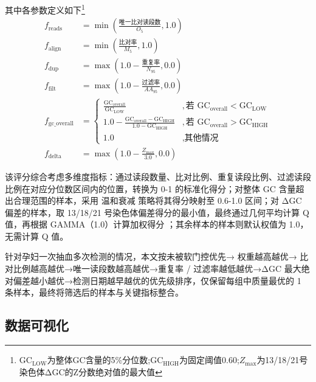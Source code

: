 其中各参数定义如下\footnote{\( \text{GC}_{\text{LOW}} \)为整体GC含量的5\%分位数;\( \text{GC}_{\text{HIGH}} \)为固定阈值0.60;\( Z_{\text{max}} \)为13/18/21号染色体ΔGC的Z分数绝对值的最大值}
\begin{align*}
f_{\text{reads}} &= \min\left( \frac{\text{唯一比对读段数}}{O_5}, 1.0 \right) \\
f_{\text{align}} &= \min\left( \frac{\text{比对率}}{M_5}, 1.0 \right) \\
f_{\text{dup}} &= \max\left( 1.0 - \frac{\text{重复率}}{N_{95}}, 0.0 \right) \\
f_{\text{filt}} &= \max\left( 1.0 - \frac{\text{过滤率}}{AA_{95}}, 0.0 \right) \\
f_{\text{gc\_overall}} &= 
\begin{cases} 
\frac{\text{GC}_{\text{overall}}}{\text{GC}_{\text{LOW}}} & ,\text{若 } \text{GC}_{\text{overall}} < \text{GC}_{\text{LOW}} \\
1.0 - \frac{\text{GC}_{\text{overall}} - \text{GC}_{\text{HIGH}}}{1.0 - \text{GC}_{\text{HIGH}}} & ,\text{若 } \text{GC}_{\text{overall}} > \text{GC}_{\text{HIGH}} \\
1.0 & ,\text{其他情况}
\end{cases} \\
f_{\text{delta}} &= \max\left( 1.0 - \frac{Z_{\text{max}}}{3.0}, 0.0 \right)
\end{align*}


该评分综合考虑多维度指标：通过读段数量、比对比例、重复读段比例、过滤读段比例在对应分位数区间内的位置，转换为 0-1 的标准化得分；对整体 GC 含量超出合理范围的样本，采用 温和衰减 策略将其得分映射至 0.6-1.0 区间；对 ΔGC 偏差的样本，取 13/18/21 号染色体偏差得分的最小值，最终通过几何平均计算 Q 值，再根据 GAMMA（1.0）计算加权得分 ；其余样本的样本则默认权值为 1.0，无需计算 Q 值。

针对孕妇一次抽血多次检测的情况，本文按未被软门控优先→ 权重越高越优→ 比对比例越高越优→唯一读段数越高越优→重复率 / 过滤率越低越优→ΔGC 最大绝对偏差越小越优→检测日期越早越优的优先级排序，仅保留每组中质量最优的 1 条样本，最终将筛选后的样本与关键指标整合。

\subsection{数据可视化}

